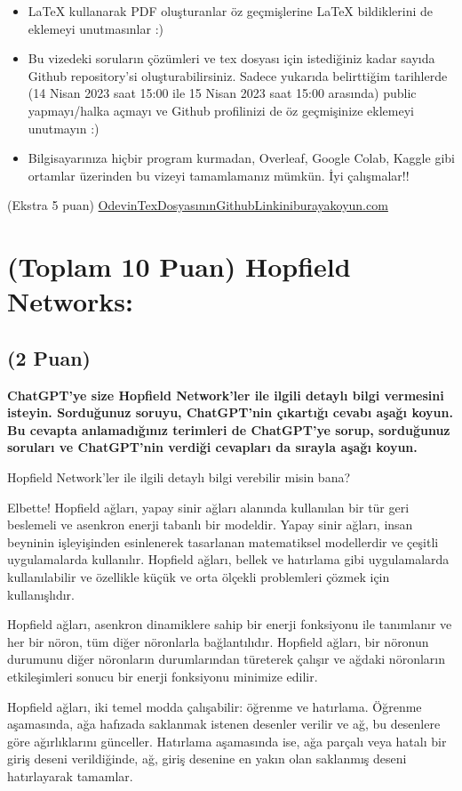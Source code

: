 \documentclass[11pt]{article}
\begin{document}
\begin{itemize}
    \item LaTeX kullanarak PDF oluşturanlar öz geçmişlerine LaTeX bildiklerini de eklemeyi unutmasınlar :)
    \item Bu vizedeki soruların çözümleri ve tex dosyası için istediğiniz kadar sayıda Github repository'si oluşturabilirsiniz. Sadece yukarıda belirttiğim tarihlerde (14 Nisan 2023 saat 15:00 ile 15 Nisan 2023 saat 15:00 arasında) public yapmayı/halka açmayı ve Github profilinizi de öz geçmişinize eklemeyi unutmayın :)
    \item Bilgisayarınıza hiçbir program kurmadan, Overleaf, Google Colab, Kaggle gibi ortamlar üzerinden bu vizeyi tamamlamanız mümkün. İyi çalışmalar!!
\end{itemize}

(Ekstra 5 puan) \url{OdevinTexDosyasınınGithubLinkiniburayakoyun.com}

\newpage
\section{(Toplam 10 Puan) Hopfield Networks:}

\subsection{(2 Puan)} \textbf{ChatGPT’ye size Hopfield Network’ler ile ilgili detaylı bilgi vermesini isteyin. Sorduğunuz soruyu, ChatGPT'nin çıkartığı cevabı aşağı koyun. Bu cevapta anlamadığınız terimleri de ChatGPT’ye sorup, sorduğunuz soruları ve ChatGPT’nin verdiği cevapları da sırayla aşağı koyun.}

Hopfield Network’ler ile ilgili detaylı bilgi verebilir misin bana?

Elbette! Hopfield ağları, yapay sinir ağları alanında kullanılan bir tür geri beslemeli ve asenkron enerji tabanlı bir modeldir. Yapay sinir ağları, insan beyninin işleyişinden esinlenerek tasarlanan matematiksel modellerdir ve çeşitli uygulamalarda kullanılır. Hopfield ağları, bellek ve hatırlama gibi uygulamalarda kullanılabilir ve özellikle küçük ve orta ölçekli problemleri çözmek için kullanışlıdır.

Hopfield ağları, asenkron dinamiklere sahip bir enerji fonksiyonu ile tanımlanır ve her bir nöron, tüm diğer nöronlarla bağlantılıdır. Hopfield ağları, bir nöronun durumunu diğer nöronların durumlarından türeterek çalışır ve ağdaki nöronların etkileşimleri sonucu bir enerji fonksiyonu minimize edilir.

Hopfield ağları, iki temel modda çalışabilir: öğrenme ve hatırlama. Öğrenme aşamasında, ağa hafızada saklanmak istenen desenler verilir ve ağ, bu desenlere göre ağırlıklarını günceller. Hatırlama aşamasında ise, ağa parçalı veya hatalı bir giriş deseni verildiğinde, ağ, giriş desenine en yakın olan saklanmış deseni hatırlayarak tamamlar.
\end{document}
